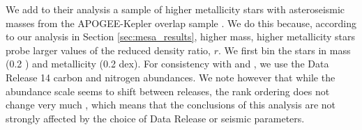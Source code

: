 We add to their analysis a sample of higher metallicity stars with asteroseismic masses from the APOGEE-Kepler overlap sample \citep[APOKASC,][]{Pinsonneault2014, Pinsonneault2018}. We do this because, according to our analysis in Section \ref{sec:mesa_results}, higher mass, higher metallicity stars probe larger values of the reduced density ratio, $r$. %
We first bin the stars in mass (0.2 \msun) and  metallicity (0.2 dex). For consistency with \citet{Pinsonneault2018} and \citet{Shetrone2019}, we use the Data Release 14 \citet{DR14} carbon and nitrogen abundances. We note however that while the abundance scale seems to shift between releases, the rank ordering does not change very much \citep{Spoo2022}, which means that the conclusions of this analysis are not strongly affected by the choice of Data Release or seismic parameters.

